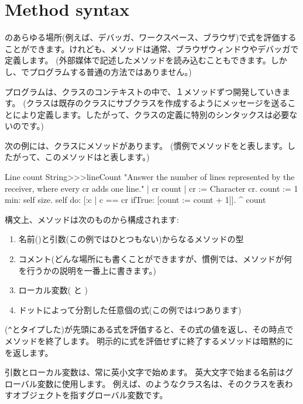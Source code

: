 \documentclass[a4paper,10pt,twoside]{book}
\begin{document}
\section{Method syntax}

\pharo のあらゆる場所(例えば、デバッガ、ワークスペース、ブラウザ)で式を評価することができます。けれども、メソッドは通常、ブラウザウィンドウやデバッガで定義します。
(外部媒体で記述したメソッドを読み込むこともできます。しかし、\pharo でプログラムする普通の方法ではありません。)

プログラムは、クラスのコンテキストの中で、１メソッドずつ開発していきます。
(クラスは既存のクラスにサブクラスを作成するようにメッセージを送ることにより定義します。したがって、クラスの定義に特別のシンタックスは必要ないのです。)

次の例には、クラスにメソッドがあります。
(慣例でメソッドをと表します。したがって、このメソッドはと表します。)

\begin{method}[lineCount]{Line count}
String>>>lineCount
   "Answer the number of lines represented by the receiver,
   where every cr adds one line."
   | cr count |
   cr := Character cr.
   count := 1 min: self size.
   self do:
      [:c | c == cr ifTrue: [count := count + 1]].
   ^ count
\end{method}

構文上、メソッドは次のものから構成されます:
\begin{enumerate}
  \item 名前(\ie {})と引数(この例ではひとつもない)からなるメソッドの型
  \item コメント(どんな場所にも書くことができますが、慣例では、メソッドが何を行うかの説明を一番上に書きます。)
  \item ローカル変数(\ie {} と )
  \item ドットによって分割した任意個の式(この例では4つあります)
\end{enumerate}

\ct{^}(\verb|^|とタイプした)が先頭にある式を評価すると、その式の値を返し、その時点でメソッドを終了します。
明示的に式を評価せずに終了するメソッドは暗黙的にを返します。

引数とローカル変数は、常に英小文字で始めます。
英大文字で始まる名前はグローバル変数に使用します。
例えば、のようなクラス名は、そのクラスを表わすオブジェクトを指すグローバル変数です。
\end{document}
